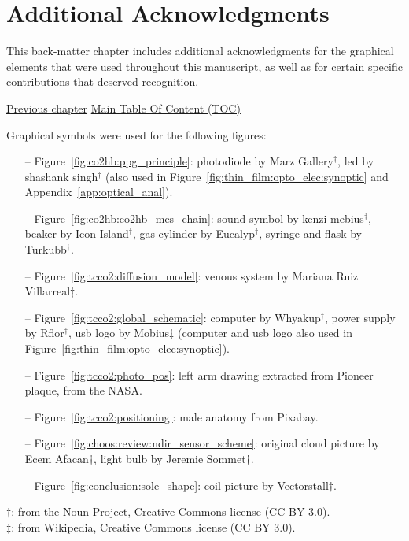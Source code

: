 \chapter{Additional Acknowledgments}\label{chap:add_ack}

\begin{tldrbox}
	This back-matter chapter includes additional acknowledgments for the graphical elements that were used throughout this manuscript, as well as for certain specific contributions that deserved recognition.
	
	\tcblower
	
	\hyperref[chap:biblio]{Previous chapter} \hfill \hyperref[chapter:toc]{Main Table Of Content (TOC)} \hfill \hphantom{Next chapter}
	
\end{tldrbox}

Graphical symbols were used for the following figures:

\begin{itemize}
	\item[--] Figure~\ref{fig:co2hb:ppg_principle}: photodiode by Marz Gallery$^\dagger$, \gls{led} by shashank singh$^\dagger$ (also used in Figure~\ref{fig:thin_film:opto_elec:synoptic} and Appendix~\ref{app:optical_anal}).
	\item[--] Figure~\ref{fig:co2hb:co2hb_mes_chain}: sound symbol by kenzi mebius$^\dagger$, beaker by Icon Island$^\dagger$, gas cylinder by Eucalyp$^\dagger$, syringe and flask by Turkubb$^\dagger$.
	\item[--] Figure~\ref{fig:tcco2:diffusion_model}: venous system by Mariana Ruiz Villarreal$\ddagger$.
	\item[--] Figure~\ref{fig:tcco2:global_schematic}: computer by Whyakup$^\dagger$, power supply by Rflor$^\dagger$, \gls{usb} logo by Mobius$\ddagger$ (computer and \gls{usb} logo also used in Figure~\ref{fig:thin_film:opto_elec:synoptic}).
	\item[--] Figure~\ref{fig:tcco2:photo_pos}: left arm drawing extracted from Pioneer plaque, from the NASA.
	\item[--] Figure~\ref{fig:tcco2:positioning}: male anatomy from Pixabay.
	\item[--] Figure~\ref{fig:choos:review:ndir_sensor_scheme}: original cloud picture by Ecem Afacan$\dagger$, light bulb by Jeremie Sommet$\dagger$.
	\item[--] Figure~\ref{fig:conclusion:sole_shape}: coil picture by Vectorstall$\dagger$.
\end{itemize}
$\dagger$: from the Noun Project, Creative Commons license (CC BY 3.0).\\$\ddagger$: from Wikipedia, Creative Commons license (CC BY 3.0).

